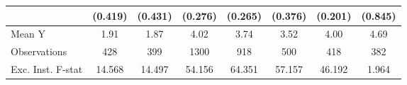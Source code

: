 {\begin{tabular}{l*{7}{c}}
            &     (0.419)         &     (0.431)         &     (0.276)         &     (0.265)         &     (0.376)         &     (0.201)         &     (0.845)         \\
\midrule
Mean Y      &        1.91         &        1.87         &        4.02         &        3.74         &        3.52         &        4.00         &        4.69         \\
Observations&         428         &         399         &        1300         &         918         &         500         &         418         &         382         \\
Exc. Inst. F-stat&      14.568         &      14.497         &      54.156         &      64.351         &      57.157         &      46.192         &       1.964         \\
\bottomrule
\end{tabular}
}
